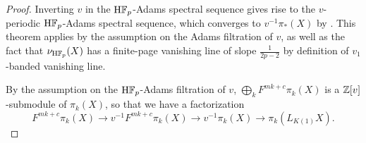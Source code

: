 \begin{proof}
    Inverting $v$ in the $\mathrm{H}\mathbb{F}_p$-Adams spectral sequence gives rise to the $v$-periodic $\mathrm{H}\mathbb{F}_p$-Adams spectral sequence, which converges to $v^{-1} \pi_{*} (X)$ by \cite[Theorem 2.13]{TripleLoop}. This theorem applies by the assumption on the Adams filtration of $v$, as well as the fact that $\nu_{\mathrm{H}\mathbb{F}_p} (X)$ has a finite-page vanishing line of slope $\frac{1}{2p-2}$ by definition of $v_1$-banded vanishing line.




    By the assumption on the $\mathrm{H}\mathbb{F}_p$-Adams filtration of $v$, $\displaystyle\bigoplus_{k} F^{m k + c} \pi_k (X)$ is a $\mathbb{Z}[v]$-submodule of $\pi_k (X)$, so that we have a factorization \[F^{mk+c} \pi_k (X) \to v^{-1} F^{mk +c} \pi_k (X) \to v^{-1} \pi_k (X) \to \pi_k (L_{K(1)} X).\]


\end{proof}
